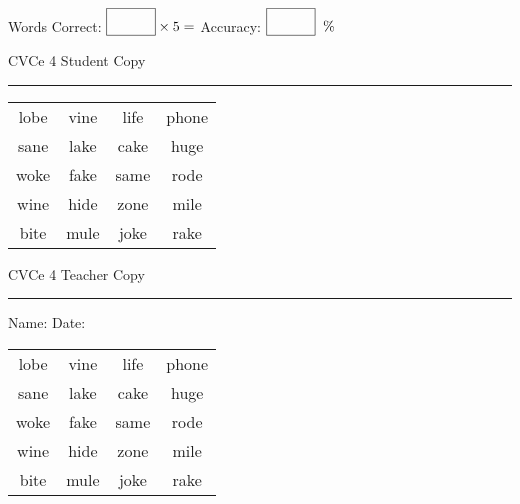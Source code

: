 \documentclass{memoir}
\begin{document}
\small

Words Correct: $\fbox{\phantom{\huge 100}} \times 5 = $ Accuracy: $\fbox{\phantom{\huge 100}}\;\; \%$ 

\vfill

\newpage


\footnotesize \noindent
CVCe 4 \hfill Student Copy
\smallskip
\hrule

\Large

\setlength{\tabcolsep}{14pt}
\def\arraystretch{2}

{\selectfont


\begin{vplace}[0.5]
\begin{center}
\begin{tabular}{cccc}
lobe & vine & life & phone \\
sane & lake & cake & huge \\
woke & fake & same & rode \\
wine & hide & zone & mile \\
bite & mule & joke & rake \\
\end{tabular}
\end{center}
\end{vplace}

}

\newpage

\footnotesize \noindent
CVCe 4 \hfill Teacher Copy
\smallskip
\hrule

\small

\vfill

\noindent
Name: \underline{\hspace{1.75in}} \hfill Date: \underline{\hspace{1in}}

\Large

{\selectfont


\begin{vplace}[0.5]
\begin{center}
\begin{tabular}{cccc}
lobe & vine & life & phone \\
sane & lake & cake & huge \\
woke & fake & same & rode \\
wine & hide & zone & mile \\
bite & mule & joke & rake \\
\end{tabular}
\end{center}
\end{vplace}



}
\end{document}

